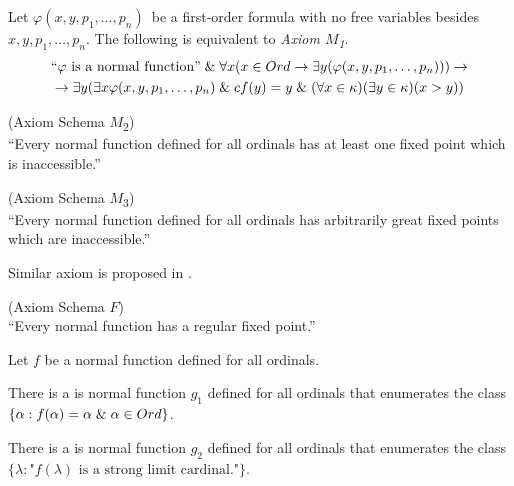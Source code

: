 
Let $\varphi(x, y, p_1, \ldots, p_n)$ be a first-order formula with no free variables besides $x, y, p_1, \ldots, p_n$. The following is equivalent to \emph{Axiom $M$\textsubscript{1}}.
\begin{equation}
\begin{gathered}
\mbox{``$\varphi$ is a normal function''} \et \forall x (x \in Ord \then \exists y(\varphi(x, y, p_1, \ldots, p_n))) \then\\
\then \exists y (\exists x \varphi(x, y, p_1, \ldots, p_n) \et cf(y) = y \et (\forall x \in \kappa)(\exists y \in \kappa)(x > y))
\end{gathered}
\end{equation}

\begin{definition}{(Axiom Schema $M$\textsubscript{2})}\\
``Every normal function defined for all ordinals has at least one fixed point which is inaccessible.''
\end{definition}

\begin{definition}{(Axiom Schema $M$\textsubscript{3})}\\
``Every normal function defined for all ordinals has arbitrarily great fixed points which are inaccessible.''
\end{definition}

Similar axiom is proposed in \cite{DrakeBook}.
\begin{definition}{(Axiom Schema $F$)}\label{def:axiom_f}\\
``Every normal function has a regular fixed point.''
\end{definition}

\begin{lemma}\label{lemma:limit_fixed_normal_function}
Let $f$ be a normal function defined for all ordinals.
\bce[(i)]
\item There is a is normal function $g_1$ defined for all ordinals that enumerates the class $\{\alpha : f(\alpha) = \alpha \mathrel{\&} \alpha \in Ord \}$.
\item There is a is normal function $g_2$ defined for all ordinals that enumerates the class $\{ \lambda : \mbox{"$f(\lambda)$ is a strong limit cardinal."}\}$. 
\ece
\end{lemma}

